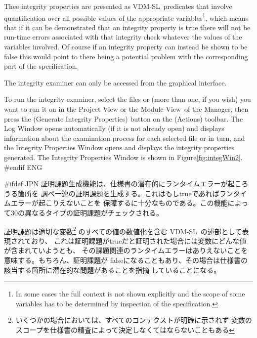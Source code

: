 \documentclass[\pformat,12pt]{article}
\newcommand{\vdmslpp}{VDM-SL}
\newcommand{\vdmModView}{\guicmd{Module View}}
\newcommand{\vdmModView}{\guicmd{モジュールビュー}}
\newcommand{\vdmslpp}{VDM++}
\newcommand{\vdmModView}{\guicmd{VDM View}}
\newcommand{\vdmModView}{\guicmd{VDMビュー}}
\newcommand{\guicmd}[1]{{\sf #1}}
\newcommand{\guicmd}[1]{{\gt #1}}
\begin{document}
Thee integrity properties are presented as \vdmslpp\ predicates that 
involve quantification over all possible values of the appropriate
variables\footnote{In some cases the full context is not shown
  explicitly and the scope of some variables has to be determined by
  inspection of the specification.}, which means that if it can be
demonstrated that an integrity property is true there will not be
run-time errors associated with that integrity check whatever the
values of the variables involved. Of course if an integrity property
can instead be shown to be false this would point to there being a
potential problem with the corresponding part of the specification.

The integrity examiner can only be accessed from the graphical
interface. 

To run the integrity examiner, select the files or
 (more than one, if you
wish) you want to run it on in the \guicmd{Project View} or the
\vdmModView\ of the \guicmd{Manager}, then press the
(\guicmd{Generate Integrity Properties}) button on the (\guicmd{Actions})
toolbar. The \guicmd{Log Window} opens automatically (if it is not
already open) and displays information about the examination process
for each selected file or 
in turn, and the \guicmd{Integrity Properties Window} opens and
displays the integrity properties generated. The \guicmd{Integrity
  Properties Window} is shown in Figure\ref{fig:integWin2}.
#endif ENG

#ifdef JPN
証明課題生成機能は、仕様書の潜在的にランタイムエラーが起ころうる箇所を
調べ一連の証明課題を生成する。これはもしtrueであればランタイムエラーが起こりえないことを
保障するに十分なものである。この機能によって30の異なるタイプの証明課題がチェックされる。

証明課題は適切な変数\footnote{いくつかの場合においては、すべてのコンテクストが明確に示されず
  変数のスコープを仕様書の精査によって決定しなくてはならないこともある} のすべての値の数値化を含む
\vdmslpp\ の述部として表現されており、
これは証明課題がtrueだと証明された場合には変数にどんな値が含まれていようとも、
その課題関連のランタイムエラーはありえないことを意味する。もちろん、証明課題が
falseになることもあり、その場合は仕様書の該当する箇所に潜在的な問題があることを指摘
していることになる。
\end{document}
